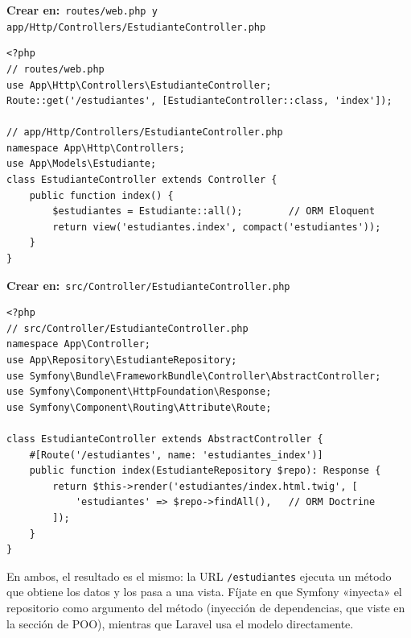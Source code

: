 \documentclass[11pt]{article}
\begin{document}
{\small\color{phpazulo}\textbf{Crear en:}~}\texttt{routes/\allowbreak{}web.\allowbreak{}php  y  app/\allowbreak{}Http/\allowbreak{}Controllers/\allowbreak{}EstudianteController.\allowbreak{}php}\par\nobreak\vspace{-1pt}
\begin{cajacodigo}
\begin{lstlisting}[style=php]
<?php
// routes/web.php
use App\Http\Controllers\EstudianteController;
Route::get('/estudiantes', [EstudianteController::class, 'index']);

// app/Http/Controllers/EstudianteController.php
namespace App\Http\Controllers;
use App\Models\Estudiante;
class EstudianteController extends Controller {
    public function index() {
        $estudiantes = Estudiante::all();        // ORM Eloquent
        return view('estudiantes.index', compact('estudiantes'));
    }
}
\end{lstlisting}
\end{cajacodigo}
\vspace{2pt}
{\small\color{phpazulo}\textbf{Crear en:}~}\texttt{src/\allowbreak{}Controller/\allowbreak{}EstudianteController.\allowbreak{}php}\par\nobreak\vspace{-1pt}
\begin{cajacodigo}
\begin{lstlisting}[style=php]
<?php
// src/Controller/EstudianteController.php
namespace App\Controller;
use App\Repository\EstudianteRepository;
use Symfony\Bundle\FrameworkBundle\Controller\AbstractController;
use Symfony\Component\HttpFoundation\Response;
use Symfony\Component\Routing\Attribute\Route;

class EstudianteController extends AbstractController {
    #[Route('/estudiantes', name: 'estudiantes_index')]
    public function index(EstudianteRepository $repo): Response {
        return $this->render('estudiantes/index.html.twig', [
            'estudiantes' => $repo->findAll(),   // ORM Doctrine
        ]);
    }
}
\end{lstlisting}
\end{cajacodigo}
\vspace{2pt}
En ambos, el resultado es el mismo: la URL \texttt{/\allowbreak{}estudiantes} ejecuta un método que obtiene los datos y los pasa a una vista. Fíjate en que Symfony «inyecta» el repositorio como argumento del método (inyección de dependencias, que viste en la sección de POO), mientras que Laravel usa el modelo directamente.
\end{document}

